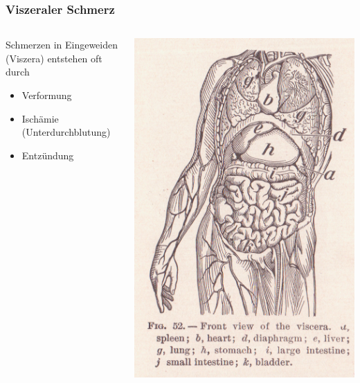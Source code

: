 \documentclass{beamer}
\begin{document}
\begin{frame}
\frametitle{Viszeraler Schmerz}

\begin{columns}[c]


\begin{column}{5cm}
Schmerzen in Eingeweiden (Viszera) entstehen oft durch
 
\begin{itemize}
\item
Verformung
\item
Ischämie (Unterdurchblutung)
\item
Entzündung
\end{itemize}
\end{column}

\begin{column}{5cm}
\begin{center}
\includegraphics[width=\textwidth]{viscera.jpg}
\end{center}

\end{column}

\end{columns}


\end{frame}
\end{document}
